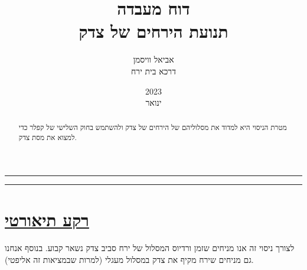 \documentclass[a4paper, 12pt]{article}
\title{דוח מעבדה \\ תנועת הירחים של צדק}
\author{אביאל וויסמן \\ \small{דרכא בית ירח}}
\date{2023 \\ ינואר}
\begin{document}
    
    \maketitle

    \vfill

    \hrule
    \vspace{15pt}

    \renewcommand{\abstractname}{מטרת הניסוי}
    \begin{abstract}
        \centering
        מטרת הניסוי היא למדוד את מסלוליהם של הירחים של צדק ולהשתמש בחוק השלישי של קפלר כדי למצוא את מסת צדק.
    \end{abstract}

    \vspace{15pt}
    \hrule

    \vfill

    {\makeatletter
        \def\@@underline#1{#1}
        \tableofcontents
    \makeatother} %

    \vfill

    \pagebreak %

    \section{\underline{רקע תיאורטי}}

    \begin{flushright}
        לצורך ניסוי זה אנו מניחים שזמן ורדיוס המסלול של ירח סביב 
        צדק נשאר קבוע.
        בנוסף אנחנו גם מניחים שירח מקיף את צדק במסלול מעגלי (למרות שבמציאות זה אליפטי).
    \end{flushright}
\end{document}
